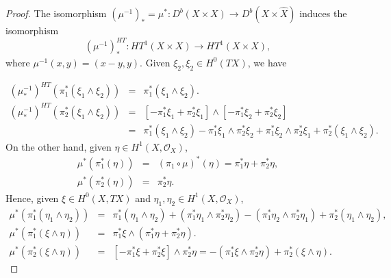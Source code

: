 \documentclass[12pt]{amsart}
\newcommand{\hide}[1]{}
\numberwithin{equation}{subsection}
\theoremstyle{plain}
\theoremstyle{definition}
\renewcommand{\P}{{\mathcal P}}
\newcommand{\StructureSheaf}[1]{{\mathcal O}_{#1}}
\begin{document}
\begin{proof}
The isomorphism $(\mu^{-1})_*=\mu^*:D^b(X\times X)\rightarrow D^b(X\times\hat{X})$ induces the isomorphism
\[
(\mu^{-1})_*^{HT}:HT^1(X\times X)\rightarrow HT^1(X\times X),
\]
where $\mu^{-1}(x,y)=(x-y,y)$. 
Given $\xi_2, \xi_2\in H^0(TX)$, we have
\hide{
\begin{eqnarray*}
(\mu^{-1}_*)^{HT}(\pi_1^*\xi_1\wedge\pi_2^*\xi_2)&=&\pi_1^*(\xi_1)\wedge[-\pi_1^*\xi_2+\pi_2^*\xi_2]
\\ &=&
-\pi_1^*(\xi_1\wedge\xi_2)+\pi_1^*\xi_1\wedge\pi_2^*\xi_2,
\\
((1\boxtimes \Psi_{\P^{-1}[n]})\circ \mu^{-1}_*)^{HT}(\pi_1^*\xi_1\wedge\pi_2^*\xi_2)&=&
-\pi_1^*(\xi_1\wedge\xi_2)+\pi_1^*\xi_1\wedge\pi_2^*\eta_2.
\end{eqnarray*}
Also
}
\begin{eqnarray*}
(\mu^{-1}_*)^{HT}(\pi_1^*(\xi_1\wedge\xi_2))&=&\pi_1^*(\xi_1\wedge\xi_2).
\\
(\mu^{-1}_*)^{HT}(\pi_2^*(\xi_1\wedge\xi_2))&=&
[-\pi_1^*\xi_1+\pi_2^*\xi_1]\wedge[-\pi_1^*\xi_2+\pi_2^*\xi_2]
\\
&=& \pi_1^*(\xi_1\wedge\xi_2)-\pi_1^*\xi_1\wedge\pi_2^*\xi_2+\pi_1^*\xi_2\wedge\pi_2^*\xi_1+\pi_2^*(\xi_1\wedge\xi_2).
\end{eqnarray*}
On the other hand, given $\eta\in H^1(X,\StructureSheaf{X})$, 
\begin{eqnarray*}
\mu^*(\pi_1^*(\eta)) &=& (\pi_1\circ\mu)^*(\eta)=\pi_1^*\eta+\pi_2^*\eta,
\\
\mu^*(\pi_2^*(\eta))&=& \pi_2^*\eta.
\end{eqnarray*}
Hence, given $\xi\in H^0(X,TX)$ and $\eta_1,\eta_2\in H^1(X,\StructureSheaf{X})$,
\begin{eqnarray*}
\mu^*(\pi_1^*(\eta_1\wedge\eta_2))&=& \pi_1^*(\eta_1\wedge\eta_2)+(\pi_1^*\eta_1\wedge\pi_2^*\eta_2)-(\pi_1^*\eta_2\wedge\pi_2^*\eta_1)+\pi_2^*(\eta_1\wedge\eta_2),
\\
\mu^*(\pi_1^*(\xi\wedge\eta))&=& \pi_1^*\xi\wedge(\pi_1^*\eta+\pi_2^*\eta).
\\
\mu^*(\pi_2^*(\xi\wedge\eta))&=& [-\pi_1^*\xi+\pi_2^*\xi]\wedge \pi_2^*\eta=-(\pi_1^*\xi\wedge\pi_2^*\eta)+\pi_2^*(\xi\wedge\eta).
\end{eqnarray*}


\end{proof}
\end{document}
